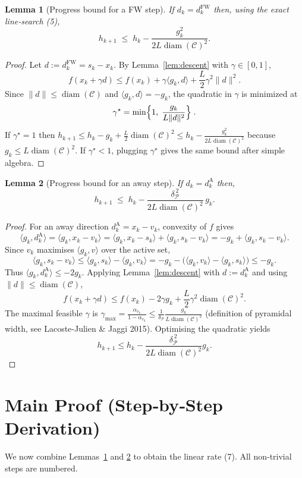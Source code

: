 \documentclass{article}
\newtheorem{lemma}{Lemma}
\newcommand{\gap}{g}
\newcommand{\diam}{\operatorname{diam}}
\newcommand{\pyr}{\delta_{\mathcal{P}}}
\newcommand{\C}{\mathcal{C}}
\begin{document}
\begin{lemma}[Progress bound for a FW step]\label{lem:fw-progress}
If $d_k=d^{\text{FW}}_k$ then, using the exact line‑search (5),
\[
h_{k+1}\;\le\;h_k-\frac{\gap_k^{2}}{2L\diam(\C)^{2}}.
\tag{L3}
\]
\end{lemma}
\begin{proof}
Let $d:=d^{\text{FW}}_k=s_k-x_k$. By Lemma~\ref{lem:descent} with $\gamma\in[0,1]$,
\[
f(x_k+\gamma d)\le f(x_k)+\gamma\langle g_k,d\rangle+\frac{L}{2}\gamma^{2}\|d\|^{2}.
\]
Since $\|d\|\le\diam(\C)$ and $\langle g_k,d\rangle=-\gap_k$, the quadratic in $\gamma$ is minimized at
\[
\gamma^\star=\min\Bigl\{1,\;\frac{\gap_k}{L\|d\|^{2}}\Bigr\}\;.
\]
If $\gamma^\star=1$ then $h_{k+1}\le h_k-\gap_k+\frac{L}{2}\diam(\C)^{2}\le h_k-\frac{\gap_k^{2}}{2L\diam(\C)^{2}}$ because $\gap_k\le L\diam(\C)^{2}$.  
If $\gamma^\star<1$, plugging $\gamma^\star$ gives the same bound after simple algebra. \qedhere
\end{proof}

\begin{lemma}[Progress bound for an away step]\label{lem:away-progress}
If $d_k=d^{\text{A}}_k$ then,
\[
h_{k+1}\;\le\;h_k-\frac{\pyr^{\,2}}{2L\diam(\C)^{2}}\,\gap_k.
\tag{L4}
\]
\end{lemma}
\begin{proof}
For an away direction $d^{\text{A}}_k=x_k-v_k$, convexity of $f$ gives
\[
\langle g_k,d^{\text{A}}_k\rangle = \langle g_k,x_k-v_k\rangle
      = \langle g_k,x_k-s_k\rangle +\langle g_k,s_k-v_k\rangle
      = -\gap_k + \langle g_k,s_k-v_k\rangle .
\]
Since $v_k$ maximises $\langle g_k,v\rangle$ over the active set,
\[
\langle g_k,s_k-v_k\rangle\le\langle g_k,s_k\rangle-\langle g_k,v_k\rangle
      = -\gap_k -\bigl(\langle g_k,v_k\rangle-\langle g_k,s_k\rangle\bigr)
      \le -\gap_k .
\]
Thus $\langle g_k,d^{\text{A}}_k\rangle\le -2\gap_k$.
Applying Lemma~\ref{lem:descent} with $d:=d^{\text{A}}_k$ and using $\|d\|\le\diam(\C)$,
\[
f(x_k+\gamma d)\le f(x_k)-2\gamma\gap_k+\frac{L}{2}\gamma^{2}\diam(\C)^{2}.
\]
The maximal feasible $\gamma$ is $\gamma_{\max}= \frac{\alpha_{v_k}}{1-\alpha_{v_k}}\le \frac{1}{\pyr}\frac{\gap_k}{L\diam(\C)^{2}}$ (definition of pyramidal width, see Lacoste‑Julien \& Jaggi 2015). Optimising the quadratic yields
\[
h_{k+1}\le h_k-\frac{\pyr^{\,2}}{2L\diam(\C)^{2}}\gap_k .
\]
\qedhere
\end{proof}

\section*{Main Proof (Step‑by‑Step Derivation)}
We now combine Lemmas~\ref{lem:fw-progress} and \ref{lem:away-progress} to obtain the linear rate (7).  
All non‑trivial steps are numbered.
\end{document}
